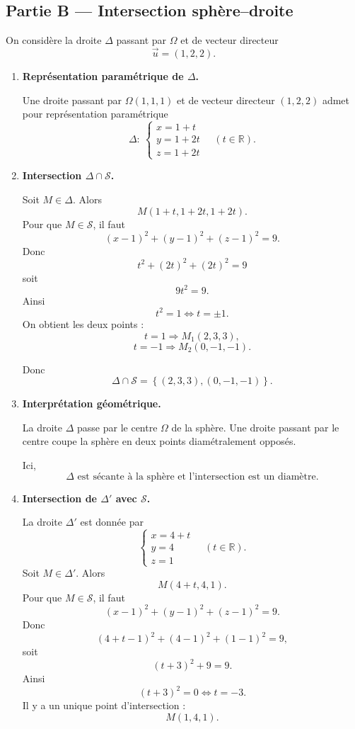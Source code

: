 \documentclass[11pt,a4paper]{article}
\newcommand{\R}{\mathbb{R}}
\newcommand{\Sphere}{\mathcal{S}}
\begin{document}
\subsection*{Partie B --- Intersection sphère--droite}

On considère la droite \(\Delta\) passant par \(\Omega\) et de vecteur directeur
\[
\vec u=(1,2,2).
\]

\begin{enumerate}[label=\textbf{\arabic*.},resume]
    \item \textbf{Représentation paramétrique de \(\Delta\).}

    Une droite passant par \(\Omega(1,1,1)\) et de vecteur directeur \((1,2,2)\) admet pour représentation paramétrique
    \[
    \boxed{
    \Delta:\ \begin{cases}
    x=1+t\\
    y=1+2t\\
    z=1+2t
    \end{cases}\quad (t\in\R).}
    \]

    \item \textbf{Intersection \(\Delta\cap \Sphere\).}

    Soit \(M\in \Delta\). Alors
    \[
    M(1+t,1+2t,1+2t).
    \]
    Pour que \(M\in \Sphere\), il faut
    \[
    (x-1)^2+(y-1)^2+(z-1)^2=9.
    \]
    Donc
    \[
    t^2+(2t)^2+(2t)^2=9
    \]
    soit
    \[
    9t^2=9.
    \]
    Ainsi
    \[
    t^2=1 \iff t=\pm 1.
    \]
    On obtient les deux points :
    \[
    t=1 \Rightarrow M_1(2,3,3),
    \]
    \[
    t=-1 \Rightarrow M_2(0,-1,-1).
    \]

    Donc
    \[
    \boxed{\Delta\cap \Sphere=\left\{(2,3,3),(0,-1,-1)\right\}.}
    \]

    \item \textbf{Interprétation géométrique.}

    La droite \(\Delta\) passe par le centre \(\Omega\) de la sphère. Une droite passant par le centre coupe la sphère en deux points diamétralement opposés.

    Ici,
    \[
    \boxed{\Delta \text{ est sécante à la sphère et l'intersection est un diamètre.}}
    \]

    \item \textbf{Intersection de \(\Delta'\) avec \(\Sphere\).}

    La droite \(\Delta'\) est donnée par
    \[
    \begin{cases}
    x=4+t\\
    y=4\\
    z=1
    \end{cases}
    \quad (t\in\R).
    \]
    Soit \(M\in \Delta'\). Alors
    \[
    M(4+t,4,1).
    \]
    Pour que \(M\in \Sphere\), il faut
    \[
    (x-1)^2+(y-1)^2+(z-1)^2=9.
    \]
    Donc
    \[
    (4+t-1)^2+(4-1)^2+(1-1)^2=9,
    \]
    soit
    \[
    (t+3)^2+9=9.
    \]
    Ainsi
    \[
    (t+3)^2=0 \iff t=-3.
    \]
    Il y a un unique point d'intersection :
    \[
    M(1,4,1).
    \]


\end{enumerate}
\end{document}
